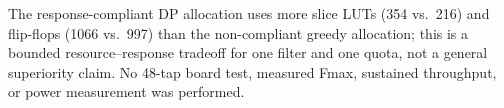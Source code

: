 The response-compliant DP allocation uses more slice LUTs (354 vs.\ 216)
and flip-flops (1066 vs.\ 997) than the non-compliant greedy allocation;
this is a bounded resource--response tradeoff for one filter and one
quota, not a general superiority claim. No 48-tap board test, measured
Fmax, sustained throughput, or power measurement was performed.
